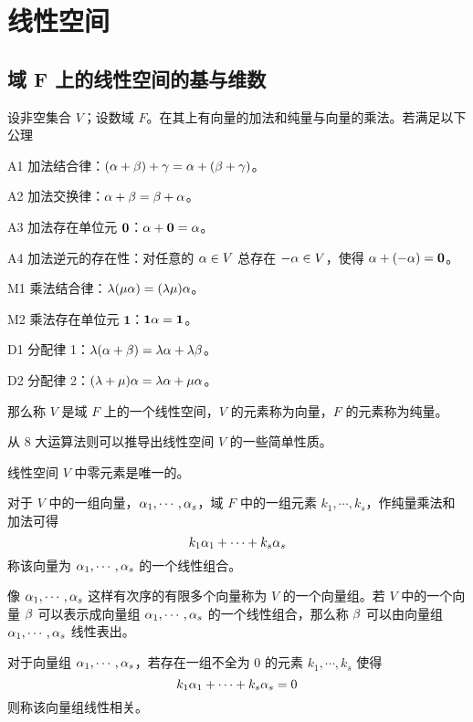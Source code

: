 \chapter{线性空间}

\section{域 F 上的线性空间的基与维数}

\begin{definition}
    设非空集合 $V$；设数域 $F$。在其上有向量的加法和纯量与向量的乘法。若满足以下公理

    A1 加法结合律：$(\alpha+\beta) + \gamma = \alpha +(\beta+\gamma)$。
    
    A2 加法交换律：$\alpha + \beta = \beta + \alpha$。
    
    A3 加法存在单位元 $\boldsymbol{0}$：$\alpha + \boldsymbol{0} = \alpha$。
    
    A4 加法逆元的存在性：对任意的 $\alpha \in V$ 总存在 $-\alpha\in V$，使得 $\alpha + (-\alpha) = \boldsymbol{0}$。
    
    M1 乘法结合律：$\lambda(\mu \alpha) = (\lambda \mu) \alpha$。
    
    M2 乘法存在单位元 $\mathbf{1}$：$\mathbf{1} \alpha = \mathbf{1}$。
    
    D1 分配律 1：$\lambda(\alpha+\beta) = \lambda \alpha + \lambda \beta$。
    
    D2 分配律 2：$(\lambda + \mu)\alpha = \lambda \alpha + \mu \alpha$。

    那么称 $V$ 是域 $F$ 上的一个线性空间，$V$ 的元素称为向量，$F$ 的元素称为纯量。
\end{definition}

从 $8$ 大运算法则可以推导出线性空间 $V$ 的一些简单性质。

\begin{theorem}
    线性空间 $V$ 中零元素是唯一的。
\end{theorem}

对于 $V$ 中的一组向量，$\alpha_1,\cdots,\alpha_s$，域 $F$ 中的一组元素 $k_1,\cdots,k_s$，作纯量乘法和加法可得
\[ k_1\alpha_1+\cdots+k_s\alpha_s \]
称该向量为 $\alpha_1,\cdots,\alpha_s$ 的一个线性组合。

像 $\alpha_1,\cdots,\alpha_s$ 这样有次序的有限多个向量称为 $V$ 的一个向量组。若 $V$ 中的一个向量 $\beta$ 可以表示成向量组 $\alpha_1,\cdots,\alpha_s$ 的一个线性组合，那么称 $\beta$ 可以由向量组 $\alpha_1,\cdots,\alpha_s$ 线性表出。

\begin{definition}[线性相关]
    对于向量组 $\alpha_1,\cdots,\alpha_s$，若存在一组不全为 $0$ 的元素 $k_1,\cdots,k_s$ 使得
    \[ k_1\alpha_1 + \cdots + k_s\alpha_s = 0 \]
    则称该向量组线性相关。
\end{definition}

